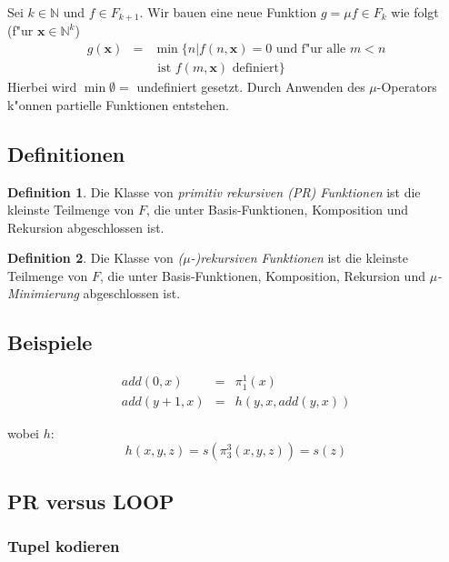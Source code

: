 \documentclass[german, 10pt, a4paper, twocolumn]{scrartcl}
\theoremstyle{definition}
\newtheorem*{definition}{Definition}
\theoremstyle{example}
\begin{document}
Sei $k \in \mathbb{N}$ und $f\in F_{k+1}$. Wir bauen eine neue Funktion $g=\mu f \in F_k$ wie folgt (f"ur $\mathbf{x} \in \mathbb{N}^k$)
\begin{eqnarray*}
	g(\mathbf{x}) &		= &	\min \{ n | f(n,\mathbf{x}) = 0 \text{ und f"ur alle } m < n\\
	&			&	\text{ ist } f(m,\mathbf{x}) \text{ definiert} \}
\end{eqnarray*}
Hierbei wird $\min \emptyset = $ undefiniert gesetzt. Durch Anwenden des $\mu$-Operators k"onnen partielle Funktionen entstehen.

\subsection{Definitionen}

\begin{definition}
	Die Klasse von \textit{primitiv rekursiven (PR) Funktionen} ist die kleinste Teilmenge von $F$, die unter Basis-Funktionen, Komposition und Rekursion abgeschlossen ist.
\end{definition}

\begin{definition}
	Die Klasse von \textit{($\mu$-)rekursiven Funktionen} ist die kleinste Teilmenge von $F$, die unter Basis-Funktionen, Komposition, Rekursion und \textit{$\mu$-Minimierung} abgeschlossen ist.
\end{definition}

\subsection{Beispiele}

\begin{eqnarray*}
	add(0,x) &	= &	\pi^1_1 (x)\\
	add(y + 1, x) &	= &	h(y,x,add(y,x))
\end{eqnarray*}

wobei $h$:
\begin{displaymath}
	h(x,y,z) = s(\pi^3_3 (x,y,z)) = s(z)
\end{displaymath}

\subsection{PR versus LOOP}

\subsubsection{Tupel kodieren}
\end{document}
